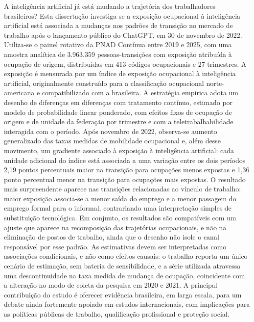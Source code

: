
\begin{resumo}
A inteligência artificial já está mudando a trajetória dos trabalhadores
brasileiros? Esta dissertação investiga se a exposição ocupacional à
inteligência artificial está associada a mudanças nos padrões de transição no
mercado de trabalho após o lançamento público do ChatGPT, em 30 de novembro de
2022. Utiliza-se o painel rotativo da PNAD Contínua entre 2019 e 2025, com uma
amostra analítica de 3.963.359 pessoas-transições com exposição atribuída à
ocupação de origem, distribuídas em 413 códigos ocupacionais e 27 trimestres. A
exposição é mensurada por um índice de exposição ocupacional à inteligência
artificial, originalmente construído para a classificação ocupacional
norte-americana e compatibilizado com a brasileira. A estratégia empírica adota
um desenho de diferenças em diferenças com tratamento contínuo, estimado por
modelo de probabilidade linear ponderado, com efeitos fixos de ocupação de
origem e de unidade da federação por trimestre e com a teletrabalhabilidade
interagida com o período. Após novembro de 2022, observa-se aumento generalizado
das taxas medidas de mobilidade ocupacional e, além desse movimento, um
gradiente associado à exposição à inteligência artificial: cada unidade
adicional do índice está associada a uma variação entre os dois períodos 2,19
pontos percentuais maior na transição para ocupações menos expostas e 1,36 ponto
percentual menor na transição para ocupações mais expostas. O resultado mais
surpreendente aparece nas transições relacionadas ao vínculo de trabalho: maior
exposição associa-se a menor saída do emprego e a menor passagem do emprego
formal para o informal, contrariando uma interpretação simples de substituição
tecnológica. Em conjunto, os resultados são compatíveis com um ajuste que
aparece na recomposição das trajetórias ocupacionais, e não na eliminação de
postos de trabalho, ainda que o desenho não isole o canal responsável por esse
padrão. As estimativas devem ser interpretadas como associações condicionais, e
não como efeitos causais: o trabalho reporta um único cenário de estimação, sem
bateria de sensibilidade, e a série utilizada atravessa uma descontinuidade na
taxa medida de mudança de ocupação, coincidente com a alteração no modo de
coleta da pesquisa em 2020 e 2021. A principal contribuição do estudo é oferecer
evidência brasileira, em larga escala, para um debate ainda fortemente apoiado
em estudos internacionais, com implicações para as políticas públicas de
trabalho, qualificação profissional e proteção social.
\end{resumo}
